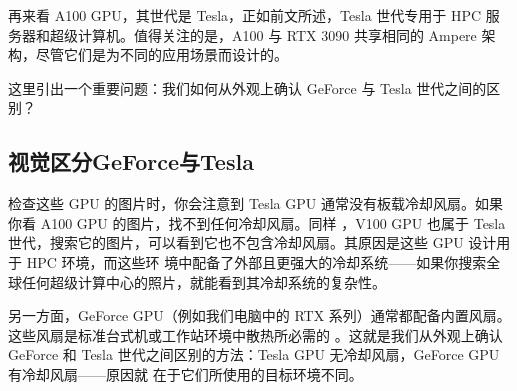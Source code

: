 再来看 A100 GPU，其世代是 Tesla，正如前文所述，Tesla 世代专用于 HPC 服务器和超级计算机。值得关注的是，A100 与 RTX 
3090 共享相同的 Ampere 架构，尽管它们是为不同的应用场景而设计的。

这里引出一个重要问题：我们如何从外观上确认 GeForce 与 Tesla 世代之间的区别？


\subsection{视觉区分GeForce与Tesla}

检查这些 GPU 的图片时，你会注意到 Tesla GPU 通常没有板载冷却风扇。如果你看 A100 GPU 的图片，找不到任何冷却风扇。同样
，V100 GPU 也属于 Tesla 世代，搜索它的图片，可以看到它也不包含冷却风扇。其原因是这些 GPU 设计用于 HPC 环境，而这些环
境中配备了外部且更强大的冷却系统——如果你搜索全球任何超级计算中心的照片，就能看到其冷却系统的复杂性。

另一方面，GeForce GPU（例如我们电脑中的 RTX 系列）通常都配备内置风扇。这些风扇是标准台式机或工作站环境中散热所必需的
。这就是我们从外观上确认 GeForce 和 Tesla 世代之间区别的方法：Tesla GPU 无冷却风扇，GeForce GPU 有冷却风扇——原因就
在于它们所使用的目标环境不同。


